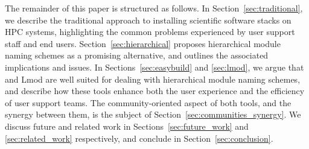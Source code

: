 The remainder of this paper is structured as follows. In Section~\ref{sec:traditional},
we describe the traditional approach to installing scientific software stacks on HPC
systems, highlighting the common problems experienced by user support staff and end
users. Section~\ref{sec:hierarchical} proposes hierarchical module naming schemes as a 
promising alternative, and outlines the associated implications and issues. In
Sections~\ref{sec:easybuild} and \ref{sec:lmod}, we argue that \easybuild{} and Lmod
are well suited  for dealing with hierarchical module naming schemes, and describe how 
these tools enhance both the user experience and the efficiency of user support teams.
The community-oriented aspect of both tools, and the synergy between them, is the
subject of Section~\ref{sec:communities_synergy}. We discuss future and related work in
Sections~\ref{sec:future_work} and \ref{sec:related_work} respectively, and conclude
in Section~\ref{sec:conclusion}.

